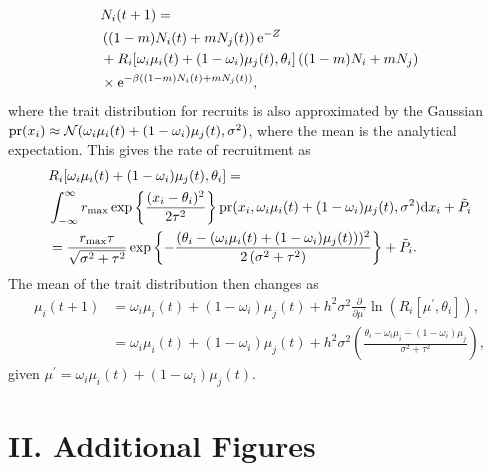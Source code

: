 \documentclass{revtex4}
\begin{document}
\begin{align}
  &N_i(t+1) = \\ \nonumber
  &\left((1-m)N_i(t) + m N_j(t) \right){\rm e}^{-Z} \\ \nonumber
  &+ R_i[\omega_i\mu_i(t) + (1-\omega_i)\mu_j(t),\theta_i]\left((1-m)N_i + mN_j\right) \\ \nonumber
  &\times {\rm e}^{-\beta ((1-m)N_i(t) + m N_j(t))},
  \label{eq:N}
\end{align}
where the trait distribution for recruits is also approximated by the Gaussian 
${\rm pr}(x_i) \approx \mathcal{N}(\omega_i\mu_i(t) + (1-\omega_i)\mu_j(t),\sigma^2)$, where the mean is the analytical expectation.
This gives the rate of recruitment as 
\begin{align}
  &R_i[\omega_i\mu_i(t) + (1-\omega_i)\mu_j(t),\theta_i] = \\ \nonumber
  &\int_{-\infty}^\infty r_{\rm max}\exp\left\{\frac{(x_i-\theta_i)^2}{2\tau^2}\right\} {\rm pr}(x_i,\omega_i\mu_i(t) + (1-\omega_i)\mu_j(t),\sigma^2) {\rm d}x_i +\tilde{P}_i\\ \nonumber
  &= \frac{r_{\rm max} \tau  }{\sqrt{\sigma ^2+\tau ^2}}\exp\left\{-\frac{(\theta_i-(\omega_i\mu_i(t) + (1-\omega_i)\mu_j(t)))^2}{2 \left(\sigma ^2+\tau ^2\right)}\right\} +\tilde{P}_i.
\end{align}
The mean of the trait distribution then changes as
\begin{align}
  \label{eq:mu}
  \mu_i(t+1) &= \omega_i\mu_i(t) + (1-\omega_i)\mu_j(t) + h^2\sigma^2\frac{\partial}{\partial \mu^\prime}\ln\left(R_i[\mu^\prime,\theta_i] \right), \\ \nonumber
  &= \omega_i\mu_i(t) + (1-\omega_i)\mu_j(t) + h^2\sigma^2\left(\frac{\theta_i - \omega_i\mu_i - (1-\omega_i)\mu_j}{\sigma^2+\tau^2} \right),
\end{align}
given $\mu^\prime = \omega_i \mu_i(t)+ (1-\omega_i)\mu_j(t)$.




\clearpage


\section*{II. Additional Figures}

% 
\end{document}
